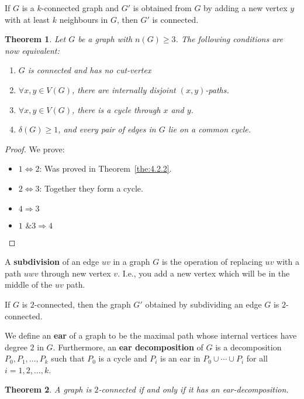 \documentclass{Book}
\newtheorem{theorem}{Theorem}
\begin{document}
\begin{lemma}
	\label{lemma:expansion}
	If $G$ is a $k$-connected graph and $G'$ is obtained from $G$ by adding a new vertex $y$ with at least $k$ neighbours in $G$, then $G'$ is connected.
\end{lemma}

\begin{theorem}
	Let $G$ be a graph with $n(G) \ge 3$. The following conditions are now equivalent:
	\begin{enumerate}
		\item $G$ is connected and has no cut-vertex
		\item \(\forall x, y \in V(G)\), there are internally disjoint $(x,y)$-paths.
		\item \(\forall x,y \in V(G)\), there is a cycle through $x$ and $y$.
		\item \(\delta(G) \ge 1\), and every pair of edges in $G$ lie on a common cycle.
	\end{enumerate}
\end{theorem}

\begin{proof}
	We prove:
	\begin{itemize}
		\item $1 \iff 2$: Was proved in Theorem~\ref{the:4.2.2}.
		\item $2 \iff 3$: Together they form a cycle.
		\item $4 \Rightarrow 3$
		\item $1 \text{ \& } 3 \Rightarrow 4$
	\end{itemize}
\end{proof}

A \textbf{subdivision} of an edge $uv$ in a graph $G$ is the operation of replacing $uv$ with a path $uwv$ through new vertex $v$. I.e., you add a new vertex which will be in the middle of the $uv$ path.

\begin{corollary}
	If $G$ is $2$-connected, then the graph $G'$ obtained by subdividing an edge $G$ is $2$-connected.
\end{corollary}

We define an \textbf{ear} of a graph to be the maximal path whose internal vertices have degree $2$ in $G$. Furthermore, an \textbf{ear decomposition} of $G$ is a decomposition $P_{0},P_{1},\ldots, P_{k}$ such that $P_{0}$ is a cycle and $P_{i}$ is an ear in $P_{0} \cup \cdots \cup P_{i}$ for all $i = 1, 2, \ldots, k$.

\begin{theorem}
	A graph is $2$-connected if and only if it has an ear-decomposition.
\end{theorem}
\end{document}
